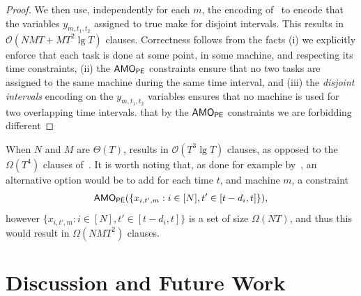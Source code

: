 \documentclass[11pt]{article}
\renewcommand{\O}{\mathcal{O}}
\begin{document}
\begin{proof}
We then use, independently for each $m$, the encoding of~ to encode that the variables $y_{m, t_1, t_2}$ assigned to true make for disjoint intervals. 
This results in $\O(N\!MT + M T^2 \lg T)$ clauses. Correctness follows from the facts (i) we explicitly enforce that each task is done at some point, in some machine, and respecting its time constraints, (ii) the $\textsf{AMO}_{\textsf{PE}}$ constraints ensure that no two tasks are assigned to the same machine during the same time interval, and (iii) the \emph{disjoint intervals} encoding on the $y_{m, t_1, t_2}$ variables ensures that no machine is used for two overlapping time intervals.
 that by the $\textsf{AMO}_{\textsf{PE}}$ constraints we are forbidding different  
\end{proof}
When $N$ and $M$ are $\Theta(T)$,  results in $\O(T^3 \lg T)$ clauses, as opposed to the $\Omega(T^4)$ clauses of~\citet{mayankEfficientSATEncoding2020}.
It is worth noting that, as done for example by~\citet{maric}, an alternative option would be to add for each time $t$, and machine $m$, a constraint 
\[
    \textsf{AMO}_{\textsf{PE}}(\{x_{i, t', m} : i \in [N], t' \in [t-d_i, t]\}),
\]
however $\{x_{i, t', m} : i \in [N], t' \in [t-d_i, t]\}$ is a set of size $\Omega(NT)$, and thus this would result in $\Omega(N\!MT^2)$ clauses. 
% 

\section{Discussion and Future Work}\label{sec:conclusions}
\end{document}
